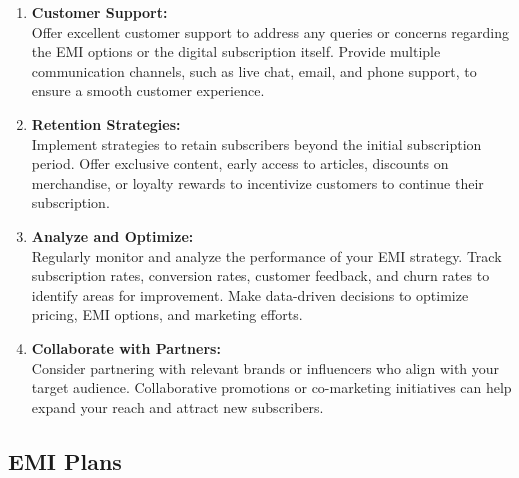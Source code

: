 \begin{enumerate}
\item \textbf{Customer Support:} \\
Offer excellent customer support to address any queries or concerns regarding the EMI options or the digital subscription itself. Provide multiple communication channels, such as live chat, email, and phone support, to ensure a smooth customer experience.

\item \textbf{Retention Strategies:} \\
Implement strategies to retain subscribers beyond the initial subscription period. Offer exclusive content, early access to articles, discounts on merchandise, or loyalty rewards to incentivize customers to continue their subscription.

\item \textbf{Analyze and Optimize:} \\
Regularly monitor and analyze the performance of your EMI strategy. Track subscription rates, conversion rates, customer feedback, and churn rates to identify areas for improvement. Make data-driven decisions to optimize pricing, EMI options, and marketing efforts.

\item \textbf{Collaborate with Partners:} \\
Consider partnering with relevant brands or influencers who align with your target audience. Collaborative promotions or co-marketing initiatives can help expand your reach and attract new subscribers.

\end{enumerate}

\subsection{EMI Plans}


